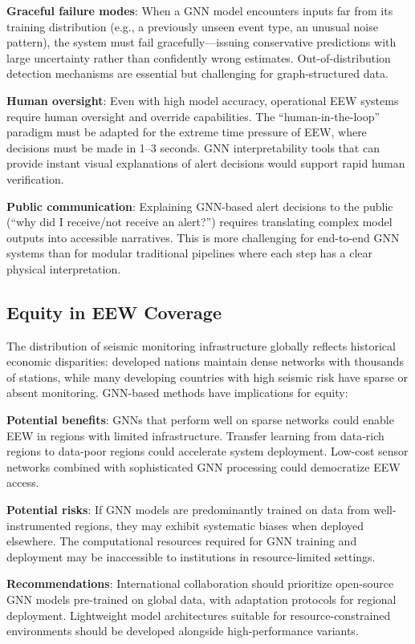 \documentclass[review,authoryear]{elsarticle}
\begin{document}
\textbf{Graceful failure modes}: When a GNN model encounters inputs far from its training distribution (e.g., a previously unseen event type, an unusual noise pattern), the system must fail gracefully---issuing conservative predictions with large uncertainty rather than confidently wrong estimates. Out-of-distribution detection mechanisms are essential but challenging for graph-structured data.

\textbf{Human oversight}: Even with high model accuracy, operational EEW systems require human oversight and override capabilities. The ``human-in-the-loop'' paradigm must be adapted for the extreme time pressure of EEW, where decisions must be made in 1--3 seconds. GNN interpretability tools that can provide instant visual explanations of alert decisions would support rapid human verification.

\textbf{Public communication}: Explaining GNN-based alert decisions to the public (``why did I receive/not receive an alert?'') requires translating complex model outputs into accessible narratives. This is more challenging for end-to-end GNN systems than for modular traditional pipelines where each step has a clear physical interpretation.

\subsection{Equity in EEW Coverage}

The distribution of seismic monitoring infrastructure globally reflects historical economic disparities: developed nations maintain dense networks with thousands of stations, while many developing countries with high seismic risk have sparse or absent monitoring. GNN-based methods have implications for equity:

\textbf{Potential benefits}: GNNs that perform well on sparse networks could enable EEW in regions with limited infrastructure. Transfer learning from data-rich regions to data-poor regions could accelerate system deployment. Low-cost sensor networks combined with sophisticated GNN processing could democratize EEW access.

\textbf{Potential risks}: If GNN models are predominantly trained on data from well-instrumented regions, they may exhibit systematic biases when deployed elsewhere. The computational resources required for GNN training and deployment may be inaccessible to institutions in resource-limited settings.

\textbf{Recommendations}: International collaboration should prioritize open-source GNN models pre-trained on global data, with adaptation protocols for regional deployment. Lightweight model architectures suitable for resource-constrained environments should be developed alongside high-performance variants.
\end{document}
